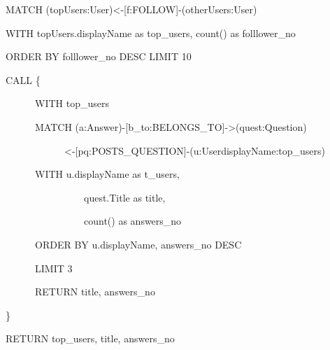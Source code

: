 \textcolor{mygreen}{MATCH} (topUsers:User)<-[f:FOLLOW]-(otherUsers:User)\par
\textcolor{mygreen}{WITH} topUsers.displayName \textcolor{mygreen}{as} top\_users, \textcolor{mygreen}{count}(\*) as folllower\_no\par
\textcolor{mygreen}{ORDER BY} folllower\_no DESC LIMIT 10\par
\textcolor{mygreen}{CALL} \{\par
    ~~~~~~\textcolor{mygreen}{WITH} top\_users \par
    ~~~~~~\textcolor{mygreen}{MATCH} (a:Answer)-[b\_to:BELONGS\_TO]->(quest:Question)\par
    ~~~~~~~~~~~~<-[pq:POSTS\_QUESTION]-(u:User{displayName:top\_users})\par
    ~~~~~~\textcolor{mygreen}{WITH} u.displayName \textcolor{mygreen}{as} t\_users,\par
    ~~~~~~~~~~~~~~~~quest.Title \textcolor{mygreen}{as} title, \par
    ~~~~~~~~~~~~~~~~\textcolor{mygreen}{count}(\*) \textcolor{mygreen}{as} answers\_no\par
    ~~~~~~\textcolor{mygreen}{ORDER BY} u.displayName, answers\_no \textcolor{mygreen}{DESC}\par
    ~~~~~~\textcolor{mygreen}{LIMIT} 3\par
    ~~~~~~\textcolor{mygreen}{RETURN} title, answers\_no\par
\}\par
\textcolor{mygreen}{RETURN} top\_users, title, answers\_no        